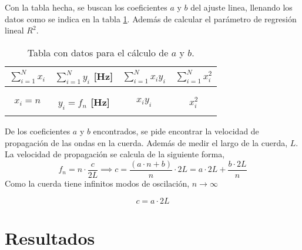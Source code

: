 \documentclass[letterpaper,11pt]{article} %
\begin{document}
Con la tabla hecha, se buscan los coeficientes $a$ y $b$ del ajuste linea, llenando los datos como se indica en la tabla \ref{tabla de ejemplo}. Además de calcular el parámetro de regresión lineal $R^2$.\\
\begin{table}[H]
\begin{tabular}{cccc}
\hline
\multicolumn{1}{|c|}{\textbf{$\sum_{i=1}^N x_i$}} & \multicolumn{1}{c|}{\textbf{$\sum_{i=1}^N y_i$ {[}Hz{]}}} & \multicolumn{1}{c|}{\textbf{$\sum_{i=1}^N x_i y_i$}} & \multicolumn{1}{c|}{\textbf{$\sum_{i=1}^N x_i^2$}} \\ \hline
\multicolumn{1}{|c|}{}                            & \multicolumn{1}{c|}{}                                     & \multicolumn{1}{c|}{}                                & \multicolumn{1}{c|}{}                              \\ \hline
                                                  &                                                           &                                                      &                                                    \\ \hline
\multicolumn{1}{|c|}{\textbf{$x_i = n$}}          & \multicolumn{1}{c|}{\textbf{$y_i = f_n$ {[}Hz{]}}}        & \multicolumn{1}{c|}{\textbf{$x_i y_i$}}              & \multicolumn{1}{c|}{\textbf{$x_i^2$}}              \\ \hline
\multicolumn{1}{|l|}{}                            & \multicolumn{1}{l|}{}                                     & \multicolumn{1}{l|}{}                                & \multicolumn{1}{l|}{}                              \\ \hline
\end{tabular}
\caption{Tabla con datos para el cálculo de $a$ y $b$. }
\label{tabla de ejemplo}
\end{table}
De los coeficientes $a$ y $b$ encontrados, se pide encontrar la velocidad de propagación de las ondas en la cuerda. Además de medir el largo de la cuerda, $L$.\\

La velocidad de propagación se calcula de la siguiente forma,
$$f_n=n\cdot \frac{c}{2L}\implies c=\frac{(a\cdot n+b)}{n}\cdot 2L=a\cdot 2L+\frac{b\cdot 2L}{n}$$
Como la cuerda tiene infinitos modos de oscilación, $n \to \infty$

$$  c=a\cdot 2L $$


\newpage
\section{Resultados}
\end{document}
